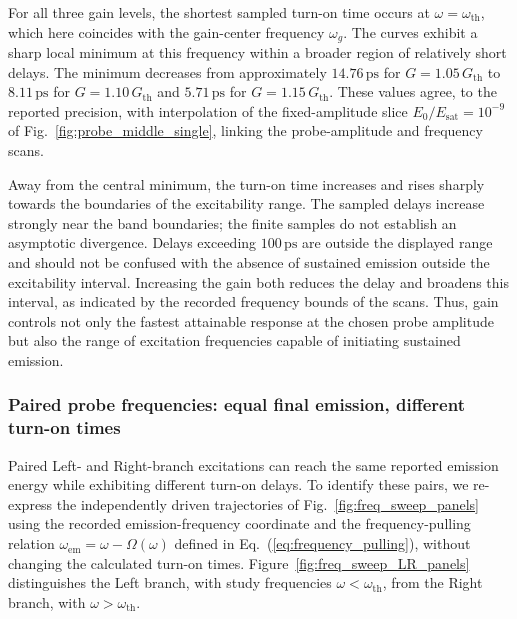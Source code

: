 \documentclass{optica-article}
\begin{document}
For all three gain levels, the shortest sampled turn-on time occurs at $\omega=\omega_{\mathrm{th}}$, which here coincides with the gain-center frequency $\omega_g$. The curves exhibit a sharp local minimum at this frequency within a broader region of relatively short delays. The minimum decreases from approximately $14.76\,\mathrm{ps}$ for $G=1.05\,G_{\mathrm{th}}$ to $8.11\,\mathrm{ps}$ for $G=1.10\,G_{\mathrm{th}}$ and $5.71\,\mathrm{ps}$ for $G=1.15\,G_{\mathrm{th}}$. These values agree, to the reported precision, with interpolation of the fixed-amplitude slice $E_0/E_{\mathrm{sat}}=10^{-9}$ of Fig.~\ref{fig:probe_middle_single}, linking the probe-amplitude and frequency scans.

Away from the central minimum, the turn-on time increases and rises sharply towards the boundaries of the excitability range. The sampled delays increase strongly near the band boundaries; the finite samples do not establish an asymptotic divergence. Delays exceeding $100\,\mathrm{ps}$ are outside the displayed range and should not be confused with the absence of sustained emission outside the excitability interval. Increasing the gain both reduces the delay and broadens this interval, as indicated by the recorded frequency bounds of the scans. Thus, gain controls not only the fastest attainable response at the chosen probe amplitude but also the range of excitation frequencies capable of initiating sustained emission.


\subsubsection{Paired probe frequencies: equal final emission, different turn-on times}
\label{sec:paired_turn_on}

Paired Left- and Right-branch excitations can reach the same reported emission energy while exhibiting different turn-on delays. To identify these pairs, we re-express the independently driven trajectories of Fig.~\ref{fig:freq_sweep_panels} using the recorded emission-frequency coordinate and the frequency-pulling relation $\omega_{\mathrm{em}}=\omega-\Omega(\omega)$ defined in Eq.~(\ref{eq:frequency_pulling}), without changing the calculated turn-on times. Figure~\ref{fig:freq_sweep_LR_panels} distinguishes the Left branch, with study frequencies $\omega<\omega_{\mathrm{th}}$, from the Right branch, with $\omega>\omega_{\mathrm{th}}$.
\end{document}
